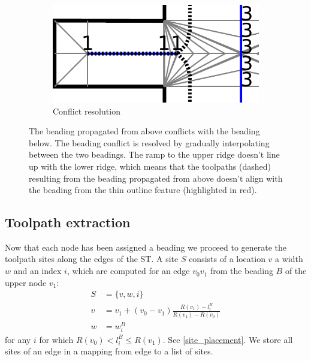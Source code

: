 \begin{figure}
\begin{subfigure}{.45\columnwidth}
\includegraphics[height=\figheight]{sources-method-beading-conflict-solved.pdf}
\caption{Conflict resolution}\label{beading_conflict_solved}
\end{subfigure}
\caption{
 The beading propagated from above conflicts with the beading below.
 The beading conflict is resolved by gradually interpolating between the two beadings.
The ramp to the upper ridge doesn't line up with the lower ridge, which means that
the toolpaths (dashed) resulting from the beading propagated from above doesn't align with the beading from the thin outline feature (highlighted in red).
}
\label{beading_conflict_problem}
\end{figure}








\subsection{Toolpath extraction}\label{sec_toolpath_extraction}
Now that each node has been assigned a beading we proceed to generate the toolpath sites along the edges of the ST.
A site $S$ consists of a location $v$ a width $w$ and an index $i$, which are computed for an edge $v_0v_1$ from the beading $B$ of the upper node $v_1$:
\begin{align*}
S &= \{ v, w, i \} \\ 
v &= v_1 + (v_0 - v_1) \frac{R(v_1) - l_i^B}{R(v_1) - R(v_0)} \\ 
w &= w_i^B
\end{align*}
for any $i$ for which $R(v_0) < l_i^B \leq R(v_1)$.
See \cref{site_placement}.
We store all sites of an edge in a mapping from edge to a list of sites.



